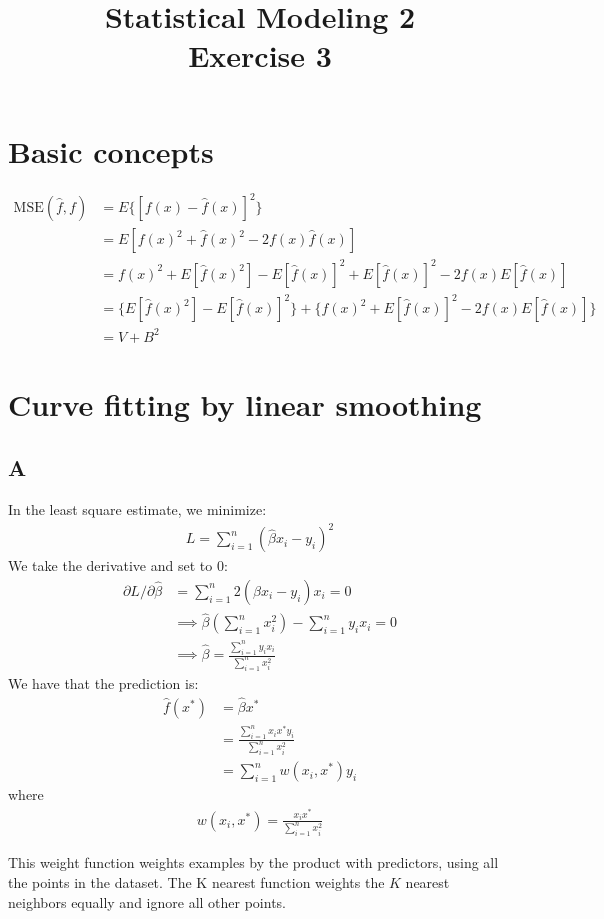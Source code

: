 \documentclass{article}
\title{Statistical Modeling 2 \\ Exercise 3}
\begin{document}
\maketitle
\section*{Basic concepts}
\begin{align*}
\mbox{MSE}(\hat{f}, f) &= E\{[f(x) - \hat{f}(x)]^2\}\\
&= E [ f(x)^2 + \hat{f}(x)^2 - 2f(x)\hat{f}(x)]\\
&=  f(x)^2 + E[\hat{f}(x)^2] - E[\hat{f}(x)]^2 + E[\hat{f}(x)]^2 - 2 f(x) E[\hat{f}(x)]\\
&= \{E[\hat{f}(x)^2] - E[\hat{f}(x)]^2\} + \{f(x)^2 + E[\hat{f}(x)]^2 - 2 f(x) E[\hat{f}(x)]\}\\
&= V + B^2
\end{align*}


\section*{Curve fitting by linear smoothing}
\subsection*{A}
In the least square estimate, we minimize:
\begin{align*}
L = \sum_{i=1}^n (\hat{\beta}x_i - y_i)^2
\end{align*}
We take the derivative and set to \(0\):
\begin{align*}
\partial L / \partial \hat{\beta} &= \sum_{i=1}^n 2 (\hat{\beta}x_i - y_i) x_i = 0\\
&\implies \hat{\beta}(\sum_{i=1}^n x_i^2) - \sum_{i=1}^n y_i x_i = 0\\
&\implies \hat{\beta} = \frac{\sum_{i=1}^n y_i x_i}{ \sum_{i=1}^n x_i^2}
\end{align*}
We have that the prediction is:
\begin{align*}
\hat{f}(x^*) &= \hat{\beta} x^*\\
&= \frac{\sum_{i=1}^n x_i x^* y_i}{ \sum_{i=1}^n x_i^2}\\
&= \sum_{i=1}^n w(x_i, x^*) y_i 
\end{align*}
where
\begin{align*}
w(x_i, x^*) = \frac{x_i x^*}{ \sum_{i=1}^n x_i^2}
\end{align*}

This weight function weights examples by the product with predictors, using all the points in the dataset. The K nearest function weights the \(K\) nearest neighbors equally and ignore all other points. 
\end{document}
